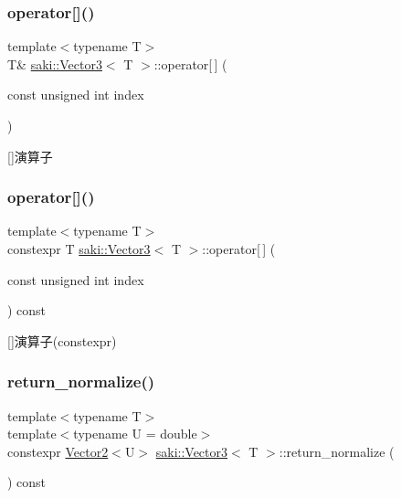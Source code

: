 \subsubsection{\texorpdfstring{operator[]()}{operator[]()}\hspace{0.1cm}{\footnotesize\ttfamily [1/2]}}
{\footnotesize\ttfamily template$<$typename T$>$ \\
T\& \mbox{\hyperlink{classsaki_1_1_vector3}{saki\+::\+Vector3}}$<$ T $>$\+::operator\mbox{[}$\,$\mbox{]} (\begin{DoxyParamCaption}\item[{const unsigned int}]{index }\end{DoxyParamCaption})\hspace{0.3cm}{\ttfamily [inline]}}



\mbox{[}\mbox{]}演算子 

\mbox{\label{classsaki_1_1_vector3_a4b41b5e2569a245144e0b0b2c84470b6}} 
\subsubsection{\texorpdfstring{operator[]()}{operator[]()}\hspace{0.1cm}{\footnotesize\ttfamily [2/2]}}
{\footnotesize\ttfamily template$<$typename T$>$ \\
constexpr T \mbox{\hyperlink{classsaki_1_1_vector3}{saki\+::\+Vector3}}$<$ T $>$\+::operator\mbox{[}$\,$\mbox{]} (\begin{DoxyParamCaption}\item[{const unsigned int}]{index }\end{DoxyParamCaption}) const\hspace{0.3cm}{\ttfamily [inline]}}



\mbox{[}\mbox{]}演算子(constexpr) 

\mbox{\label{classsaki_1_1_vector3_ab4bbc1a8a3cbf860996a5136b3c1536f}} 
\subsubsection{\texorpdfstring{return\+\_\+normalize()}{return\_normalize()}}
{\footnotesize\ttfamily template$<$typename T$>$ \\
template$<$typename U  = double$>$ \\
constexpr \mbox{\hyperlink{classsaki_1_1_vector2}{Vector2}}$<$U$>$ \mbox{\hyperlink{classsaki_1_1_vector3}{saki\+::\+Vector3}}$<$ T $>$\+::return\+\_\+normalize (\begin{DoxyParamCaption}{ }\end{DoxyParamCaption}) const\hspace{0.3cm}{\ttfamily [inline]}}



